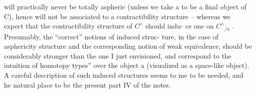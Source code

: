 will practically never be totally aspheric (unless we take a to be a final
object of C), hence will not be associated to a contractibility structure
-- whereas we expect that the contractibility structure of $C^\wedge$ should indu-%
ce one on $C^\wedge{}_{/a}$ . Presumably, the ``correct'' notions of induced struc-%
ture, in the case of asphericity structure and the corresponding notion
of weak equivalence, should be  considerably stronger than the
one I just envisioned, and correspond to the intuition of \hand{\uline{\textcolor{black}{``fiberwise}}}
homotopy types'' over the object a (visualized as a space-like object).
A careful description of such induced structures seems to me to be
needed, and he natural place to be the present part IV of the notes.

